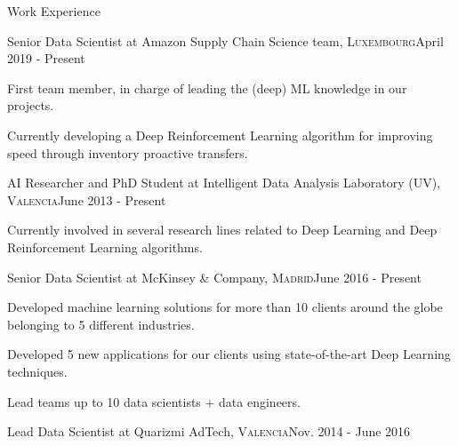 \documentclass{resume} %
\begin{document}
\begin{rSection}{ Work Experience } \itemsep -1pt       
\begin{rSubsection}{Senior Data Scientist at Amazon Supply Chain Science team, \textnormal{\textsc{Luxembourg}}}{April 2019 - Present}{}    
	
	\vspace{-3pt}
	
	\item First team member, in charge of leading the (deep) ML knowledge in our projects.
	\item Currently developing a Deep Reinforcement Learning algorithm for improving speed through inventory proactive transfers.
\end{rSubsection} 


\vspace{-6pt}

\begin{rSubsection}{AI Researcher and PhD Student at Intelligent Data Analysis Laboratory (UV), \textnormal{\textsc{Valencia}}}{June 2013 - Present}{}
	
	\vspace{-3pt}
	
	\item Currently involved in several research lines related to Deep Learning and Deep Reinforcement Learning algorithms.
	
\end{rSubsection}
	
\vspace{-6pt}

\begin{rSubsection}{Senior Data Scientist at McKinsey \& Company, \textnormal{\textsc{Madrid}}}{June 2016 - Present}{}    
    
    \vspace{-3pt}
    
    \item Developed machine learning solutions for more than 10 clients around the globe belonging to 5 different industries.
    \item Developed 5 new applications for our clients using state-of-the-art Deep Learning techniques.
    \item Lead teams up to 10 data scientists + data engineers.
\end{rSubsection} 

\vspace{-6pt}

\begin{rSubsection}{Lead Data Scientist at Quarizmi AdTech, \textnormal{\textsc{Valencia}}}{Nov. 2014 - June 2016}{}
    

\end{rSubsection}
\end{rSection}
\end{document}

